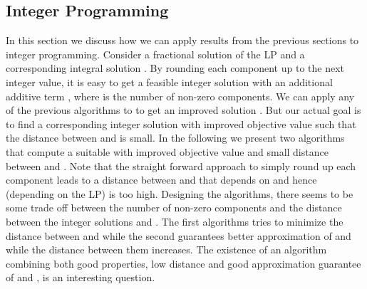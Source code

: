 \documentclass[a4paper,11pt]{article}
\begin{document}
\subsection{Integer Programming}
\label{sec:integer}
In this section we discuss how we can apply results from the previous sections to integer programming.
Consider a fractional solution  of the LP and a corresponding integral solution . 
By rounding each component  up to the next integer value, it is easy to get a feasible
integer solution  with an additional additive term , where  is the number of 
non-zero components.
We can apply any of the previous algorithms to  to get an improved solution .
But our actual goal is to find a corresponding integer solution 
with improved objective value  such that the 
distance between  and  is small.
In the following we present two algorithms that compute a suitable  with improved objective value and small
distance between  and .
Note that the straight forward approach to simply round up each component  leads to a distance between
 and  that depends on  and hence (depending on the LP) is too high.
Designing the algorithms, there seems to be some trade off between the number of non-zero components and the
distance between the integer solutions  and . The first algorithms tries to minimize the distance 
between  and  while
the second guarantees better approximation of  and  while the distance between them increases.
The existence of an algorithm combining both good properties, low distance and good approximation guarantee of 
 and , is an interesting question.
\end{document}

